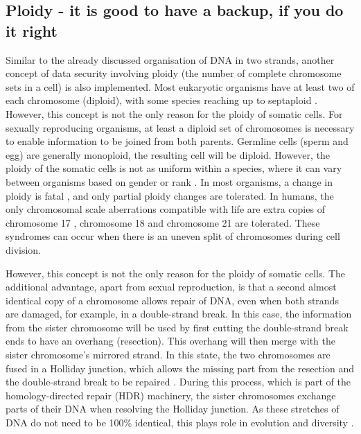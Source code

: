 \subsection[Ploidy]{Ploidy - it is good to have a backup, if you do it right}
\label{intro-sec:ploidy}
Similar to the already discussed organisation of DNA in two strands, another concept of data security\remove{,} involving ploidy (the number of complete chromosome sets in a cell) is also implemented. Most eukaryotic organisms have at least two of each chromosome (diploid), with some species reaching up to septaploid \cite{Tateoka1975}. However, this concept is not the only reason for the ploidy of somatic cells. For sexually reproducing organisms, at least a diploid set of chromosomes is necessary to enable information to be joined from both parents. Germline cells (sperm and egg) are generally monoploid,  the resulting cell will be diploid. However, the ploidy of the somatic cells is not as uniform within a species, where it can vary between organisms based on gender or rank \cite{Trivers1976}. 
In most organisms, a change in ploidy is fatal \cite{Otto2007}, and only partial ploidy changes are tolerated. In humans, the only chromosomal scale aberrations compatible with life are extra copies of chromosome 17 \cite{Gottlieb1962}, chromosome 18 \cite{Cereda2012} and chromosome 21 \cite{Hulten2008} are tolerated. These syndromes can occur when there is an uneven split of chromosomes during cell division.

However, this concept is not the only reason for the ploidy of somatic cells. The additional advantage, apart from sexual reproduction, is that a second almost identical copy of a chromosome allows repair of DNA, even when both strands are damaged, for example, in a double-strand break.
In this case, the information from the sister chromosome will be used by first cutting the double-strand break ends to have an overhang (resection). This overhang will then merge with the sister chromosome's mirrored strand. In this state, the two chromosomes are fused in a Holliday junction, which allows the missing part from the resection and the double-strand break to be repaired \cite{Lilley2000}. During this process, which is part of the homology-directed repair (HDR) machinery, the sister chromosomes exchange parts of their DNA when resolving the Holliday junction. As these stretches of DNA do not need to be 100\% identical, this plays  role in evolution and diversity \cite{Hanage2006,Kong2013}.


